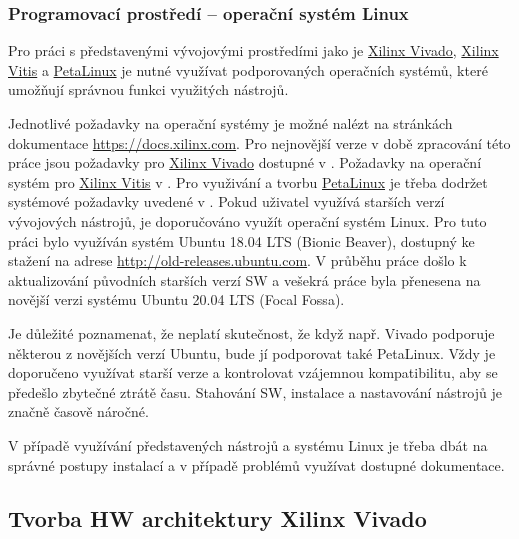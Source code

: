 \documentclass[a4paper, twoside, 11pt]{article}
\begin{document}
		\subsubsection{Programovací prostředí – operační systém Linux}
			Pro práci s představenými vývojovými prostředími jako je \hyperref[subsubsec:xilinx-vivado]{Xilinx Vivado}, \hyperref[subsubsec:xilinx-vitis]{Xilinx Vitis} a \hyperref[subsubsec:petalinux]{PetaLinux} je nutné využívat podporovaných operačních systémů, které umožňují správnou funkci využitých nástrojů.\par
			Jednotlivé požadavky na operační systémy je možné nalézt na stránkách dokumentace \href{https://docs.xilinx.com}{\textcolor{ctublue}{https://docs.xilinx.com}}. Pro nejnovější verze v době zpracování této práce jsou požadavky pro \hyperref[subsubsec:xilinx-vivado]{Xilinx Vivado} dostupné v \cite{xilinx-vivado-design-suite-user-guide-2022}. Požadavky na operační systém pro \hyperref[subsubsec:xilinx-vitis]{Xilinx Vitis} v \cite{vitis-unified-software-platform-documentation-2022}. Pro využivání a tvorbu \hyperref[subsubsec:petalinux]{PetaLinux} je třeba dodržet systémové požadavky uvedené v \cite{petalinux-tools-documentation-2022}.
			Pokud uživatel využívá starších verzí vývojových nástrojů, je doporučováno využít operační systém Linux. Pro tuto práci bylo využíván systém Ubuntu 18.04 LTS (Bionic Beaver), dostupný ke stažení na adrese \href{http://old-releases.ubuntu.com}{\textcolor{ctublue}{http://old-releases.ubuntu.com}}. V průběhu práce došlo k aktualizování původních starších verzí SW a vešekrá práce byla přenesena na novější verzi systému Ubuntu 20.04 LTS (Focal Fossa).\par
			Je důležité poznamenat, že neplatí skutečnost, že když např. Vivado podporuje některou z novějších verzí Ubuntu, bude jí podporovat také PetaLinux. Vždy je doporučeno využívat starší verze a kontrolovat vzájemnou kompatibilitu, aby se předešlo zbytečné ztrátě času. Stahování SW, instalace a nastavování nástrojů je značně časově náročné.\par
			V případě využívání představených nástrojů a systému Linux je třeba dbát na správné postupy instalací a v případě problémů využívat dostupné dokumentace.
	\subsection{Tvorba HW architektury Xilinx Vivado}
\end{document}
